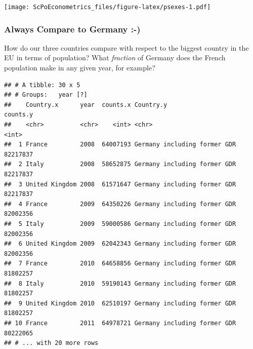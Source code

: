 \documentclass[]{book}
\newenvironment{Shaded}{\begin{snugshade}}{\end{snugshade}}
\newcommand{\KeywordTok}[1]{\textcolor[rgb]{0.13,0.29,0.53}{\textbf{#1}}}
\newcommand{\DataTypeTok}[1]{\textcolor[rgb]{0.13,0.29,0.53}{#1}}
\newcommand{\StringTok}[1]{\textcolor[rgb]{0.31,0.60,0.02}{#1}}
\newcommand{\CommentTok}[1]{\textcolor[rgb]{0.56,0.35,0.01}{\textit{#1}}}
\newcommand{\OperatorTok}[1]{\textcolor[rgb]{0.81,0.36,0.00}{\textbf{#1}}}
\newcommand{\NormalTok}[1]{#1}
\theoremstyle{definition}
\theoremstyle{definition}
\theoremstyle{definition}
\theoremstyle{remark}
\begin{document}
\texttt{[image: ScPoEconometrics\_files/figure-latex/psexes-1.pdf]}

\subsubsection*{Always Compare to Germany
:-)}\label{always-compare-to-germany--}

How do our three countries compare with respect to the biggest country
in the EU in terms of population? What \emph{fraction} of Germany does
the French population make in any given year, for example?

\begin{Shaded}
\end{Shaded}

\begin{verbatim}
## # A tibble: 30 x 5
## # Groups:   year [?]
##    Country.x      year  counts.x Country.y                    counts.y
##    <chr>          <chr>    <int> <chr>                           <int>
##  1 France         2008  64007193 Germany including former GDR 82217837
##  2 Italy          2008  58652875 Germany including former GDR 82217837
##  3 United Kingdom 2008  61571647 Germany including former GDR 82217837
##  4 France         2009  64350226 Germany including former GDR 82002356
##  5 Italy          2009  59000586 Germany including former GDR 82002356
##  6 United Kingdom 2009  62042343 Germany including former GDR 82002356
##  7 France         2010  64658856 Germany including former GDR 81802257
##  8 Italy          2010  59190143 Germany including former GDR 81802257
##  9 United Kingdom 2010  62510197 Germany including former GDR 81802257
## 10 France         2011  64978721 Germany including former GDR 80222065
## # ... with 20 more rows
\end{verbatim}
\end{document}
